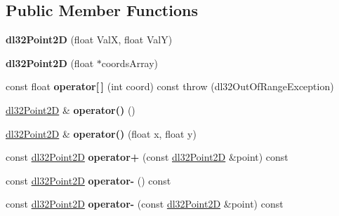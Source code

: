 \subsection*{Public Member Functions}
\begin{DoxyCompactItemize}
\item 
\hypertarget{structdl32_point2_d_a01c5c4259def324227be846ffad01829}{{\bfseries dl32\-Point2\-D} (float Val\-X, float Val\-Y)}\label{structdl32_point2_d_a01c5c4259def324227be846ffad01829}

\item 
\hypertarget{structdl32_point2_d_a928eb05410f809c074100cf8643bf61f}{{\bfseries dl32\-Point2\-D} (float $\ast$coords\-Array)}\label{structdl32_point2_d_a928eb05410f809c074100cf8643bf61f}

\item 
\hypertarget{structdl32_point2_d_a835d47729cf83589b5a165aa61c68ea4}{const float {\bfseries operator\mbox{[}$\,$\mbox{]}} (int coord) const   throw (dl32\-Out\-Of\-Range\-Exception)}\label{structdl32_point2_d_a835d47729cf83589b5a165aa61c68ea4}

\item 
\hypertarget{structdl32_point2_d_a5417b7fe6de63491406f1a9cf65a08d4}{\hyperlink{structdl32_point2_d}{dl32\-Point2\-D} \& {\bfseries operator()} ()}\label{structdl32_point2_d_a5417b7fe6de63491406f1a9cf65a08d4}

\item 
\hypertarget{structdl32_point2_d_a9043e9070d902a34a358bf94bc204c54}{\hyperlink{structdl32_point2_d}{dl32\-Point2\-D} \& {\bfseries operator()} (float x, float y)}\label{structdl32_point2_d_a9043e9070d902a34a358bf94bc204c54}

\item 
\hypertarget{structdl32_point2_d_a43470ac9404213b79dd61c183bf4f5d0}{const \hyperlink{structdl32_point2_d}{dl32\-Point2\-D} {\bfseries operator+} (const \hyperlink{structdl32_point2_d}{dl32\-Point2\-D} \&point) const }\label{structdl32_point2_d_a43470ac9404213b79dd61c183bf4f5d0}

\item 
\hypertarget{structdl32_point2_d_a18fd6120e5696a4ade9b5ae9ee781ae2}{const \hyperlink{structdl32_point2_d}{dl32\-Point2\-D} {\bfseries operator-\/} () const }\label{structdl32_point2_d_a18fd6120e5696a4ade9b5ae9ee781ae2}

\item 
\hypertarget{structdl32_point2_d_a528e67f5716e325d6265b1e368e0cca4}{const \hyperlink{structdl32_point2_d}{dl32\-Point2\-D} {\bfseries operator-\/} (const \hyperlink{structdl32_point2_d}{dl32\-Point2\-D} \&point) const }\label{structdl32_point2_d_a528e67f5716e325d6265b1e368e0cca4}


\end{DoxyCompactItemize}
